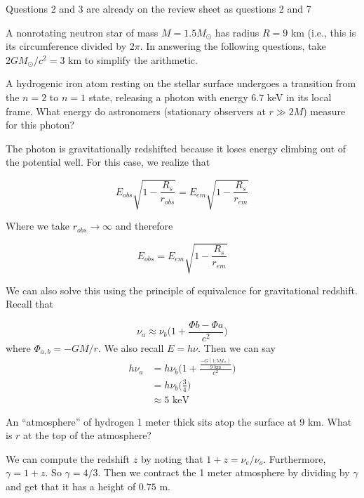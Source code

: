 \documentclass[11pt,largemargins]{homework}
\begin{document}
\color{red}
Questions 2 and 3 are already on the review sheet as questions 2 and 7
\color{black}
\setcounter{questionCounter}{3}

\question
A nonrotating neutron star of mass $M = 1.5 M_{\odot}$ has radius $R = 9$ km (i.e., this is its circumference divided by $2 \pi$.  In answering the following questions, take $2GM_{\odot}/c^2 = 3$ km to simplify the arithmetic.

\begin{alphaparts}
\questionpart
A hydrogenic iron atom resting on the stellar surface undergoes a transition from the $n=2$ to $n=1$ state, releasing a photon with energy $6.7$ keV in its local frame.  What energy do astronomers (stationary observers at $r \gg 2M$) measure for this photon?

The photon is gravitationally redshifted because it loses energy climbing out of the potential well.  For this case, we realize that

$$E_{obs} \sqrt{1 - \frac{R_s}{r_{obs}}} = E_{em} \sqrt{1 - \frac{R_s}{r_{em}}} $$

Where we take $r_{obs} \to \infty$ and therefore

$$E_{obs} = E_{em} \sqrt{1 - \frac{R_s}{r_{em}}} $$

We can also solve this using the principle of equivalence for gravitational redshift.  Recall that

\begin{equation}
\nu_{a} \approx \nu_{b} \Big(1 + \frac{\Phi{b} - \Phi{a}}{c^2} \Big)
\end{equation}
where $\Phi_{a,b} = -GM/r$.  We also recall $E = h\nu$.  Then we can say
\begin{subequations}
\begin{align*}
h\nu_{a} &= h\nu_{b} \Big(1 + \frac{\frac{-G(1.5M_{\odot})}{9 \mbox{ km}}}{c^2} \Big) \\
&= h \nu_{b} \Big(\frac{3}{4}\Big) \\
&\approx 5 \mbox{ keV}
\end{align*}
\end{subequations}

\questionpart
An ``atmosphere'' of hydrogen 1 meter thick sits atop the surface at 9 km.  What is $r$ at the top of the atmosphere? 

We can compute the redshift $z$ by noting that $1 + z = \nu_{e} / \nu_{o}$.  Furthermore, $\gamma = 1 + z$.  So $\gamma = 4/3$. Then we contract the 1 meter atmosphere by dividing by $\gamma$ and get that it has a height of $0.75 \mbox{ m}$.  


\end{alphaparts}
\end{document}
